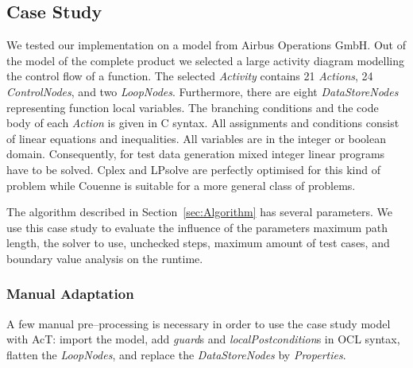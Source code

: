 \documentclass[runningheads,a4paper]{llncs}%
\newcommand{\UMLType}[1]{\textsf{\textit{#1}}} %
\newcommand{\UMLReference}[1]{\textsf{\textit{#1}}} %
\begin{document}
\subsection{Case Study}
\label{sec:CaseStudy}
We tested our implementation on a model from Airbus Operations GmbH. Out of the
model of the complete product we selected a large activity diagram modelling the
control flow of a function. The selected \UMLType{Activity} contains 21
\UMLType{Actions}, 24 \UMLType{ControlNodes}, and two \UMLType{LoopNodes}.
Furthermore, there are eight \UMLType{DataStoreNodes} representing function
local variables. The branching conditions and the code body of each
\UMLType{Action} is given in C syntax. All assignments and conditions consist of
linear equations and inequalities. All variables are in the integer or boolean
domain. Consequently, for test data generation mixed integer linear programs
have to be solved. Cplex and LPsolve are perfectly optimised for this kind of
problem while Couenne is suitable for a more general class of problems.

The algorithm described in Section~\ref{sec:Algorithm} has several parameters.
We use this case study to evaluate the influence of the parameters maximum path
length, the solver to use, unchecked steps, maximum amount of test cases, and
boundary value analysis on the runtime.
%
\subsubsection{Manual Adaptation}
\label{sec:CaseStudy_ManualAdaptation}
A few manual pre--processing is necessary in order to use the case study model
with AcT: import the model, add \UMLReference{guard}s and
\UMLReference{localPostcondition}s in OCL syntax, flatten the
\UMLType{LoopNodes}, and replace the \UMLType{DataStoreNodes} by
\UMLType{Properties}.
\end{document}
